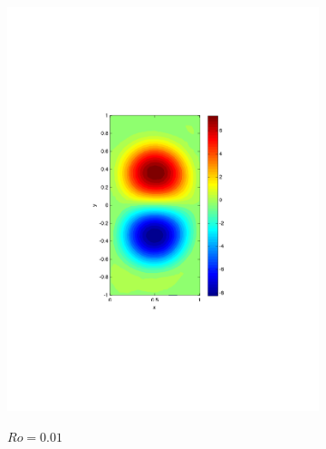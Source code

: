\begin{figure}
\begin{center}
\begin{subfigure}{0.3\textwidth}
    \includegraphics[scale=0.5]{Figures/Re200Ro1E-2h16k1000}
    \label{sfi:QGERo0.01}
    \caption{$Ro=0.01$}
  \end{subfigure}
  \begin{subfigure}{0.3\textwidth}
    \centering

\end{subfigure}
\end{center}
\end{figure}
